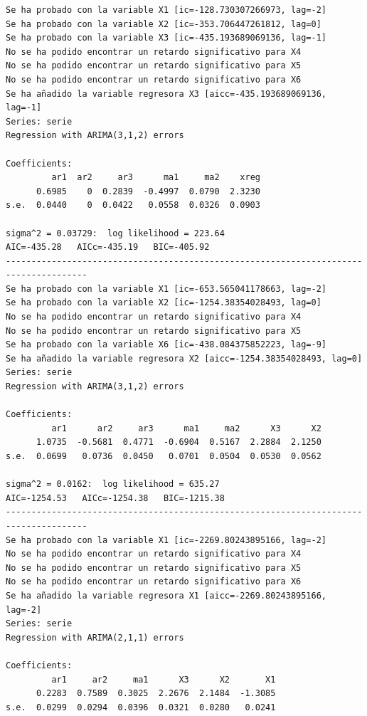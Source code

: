 \documentclass[
  12pt,
  a4paper]{article}
\begin{document}
\begin{verbatim}
Se ha probado con la variable X1 [ic=-128.730307266973, lag=-2]
Se ha probado con la variable X2 [ic=-353.706447261812, lag=0]
Se ha probado con la variable X3 [ic=-435.193689069136, lag=-1]
No se ha podido encontrar un retardo significativo para X4
No se ha podido encontrar un retardo significativo para X5
No se ha podido encontrar un retardo significativo para X6
Se ha añadido la variable regresora X3 [aicc=-435.193689069136, lag=-1]
Series: serie 
Regression with ARIMA(3,1,2) errors 

Coefficients:
         ar1  ar2     ar3      ma1     ma2    xreg
      0.6985    0  0.2839  -0.4997  0.0790  2.3230
s.e.  0.0440    0  0.0422   0.0558  0.0326  0.0903

sigma^2 = 0.03729:  log likelihood = 223.64
AIC=-435.28   AICc=-435.19   BIC=-405.92
--------------------------------------------------------------------------------------
Se ha probado con la variable X1 [ic=-653.565041178663, lag=-2]
Se ha probado con la variable X2 [ic=-1254.38354028493, lag=0]
No se ha podido encontrar un retardo significativo para X4
No se ha podido encontrar un retardo significativo para X5
Se ha probado con la variable X6 [ic=-438.084375852223, lag=-9]
Se ha añadido la variable regresora X2 [aicc=-1254.38354028493, lag=0]
Series: serie 
Regression with ARIMA(3,1,2) errors 

Coefficients:
         ar1      ar2     ar3      ma1     ma2      X3      X2
      1.0735  -0.5681  0.4771  -0.6904  0.5167  2.2884  2.1250
s.e.  0.0699   0.0736  0.0450   0.0701  0.0504  0.0530  0.0562

sigma^2 = 0.0162:  log likelihood = 635.27
AIC=-1254.53   AICc=-1254.38   BIC=-1215.38
--------------------------------------------------------------------------------------
Se ha probado con la variable X1 [ic=-2269.80243895166, lag=-2]
No se ha podido encontrar un retardo significativo para X4
No se ha podido encontrar un retardo significativo para X5
No se ha podido encontrar un retardo significativo para X6
Se ha añadido la variable regresora X1 [aicc=-2269.80243895166, lag=-2]
Series: serie 
Regression with ARIMA(2,1,1) errors 

Coefficients:
         ar1     ar2     ma1      X3      X2       X1
      0.2283  0.7589  0.3025  2.2676  2.1484  -1.3085
s.e.  0.0299  0.0294  0.0396  0.0321  0.0280   0.0241


\end{verbatim}
\end{document}
